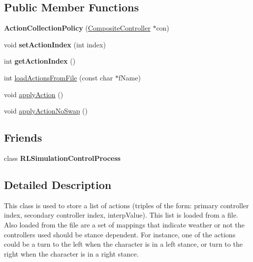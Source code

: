 \subsection*{Public Member Functions}
\begin{DoxyCompactItemize}
\item 
\hypertarget{classCartWheel_1_1Core_1_1ActionCollectionPolicy_a7380c4a5db84ecf445685c0c90b859d2}{
{\bfseries ActionCollectionPolicy} (\hyperlink{classCartWheel_1_1Core_1_1CompositeController}{CompositeController} $\ast$con)}
\label{classCartWheel_1_1Core_1_1ActionCollectionPolicy_a7380c4a5db84ecf445685c0c90b859d2}

\item 
\hypertarget{classCartWheel_1_1Core_1_1ActionCollectionPolicy_a221d8930e20ff82b76e67a353e070442}{
void {\bfseries setActionIndex} (int index)}
\label{classCartWheel_1_1Core_1_1ActionCollectionPolicy_a221d8930e20ff82b76e67a353e070442}

\item 
\hypertarget{classCartWheel_1_1Core_1_1ActionCollectionPolicy_ae20a888943cdd6d01697114ae3cf4058}{
int {\bfseries getActionIndex} ()}
\label{classCartWheel_1_1Core_1_1ActionCollectionPolicy_ae20a888943cdd6d01697114ae3cf4058}

\item 
int \hyperlink{classCartWheel_1_1Core_1_1ActionCollectionPolicy_a810258838684fde8a79b5df92d3eacde}{loadActionsFromFile} (const char $\ast$fName)
\item 
void \hyperlink{classCartWheel_1_1Core_1_1ActionCollectionPolicy_afe57e1a3ba3f7f8463e1d1b550a57d51}{applyAction} ()
\item 
void \hyperlink{classCartWheel_1_1Core_1_1ActionCollectionPolicy_a12bc039ce38d711ccb1f89bb395fc3a9}{applyActionNoSwap} ()
\end{DoxyCompactItemize}
\subsection*{Friends}
\begin{DoxyCompactItemize}
\item 
\hypertarget{classCartWheel_1_1Core_1_1ActionCollectionPolicy_a1cd8cd00d480ef41fceb1a0027f6c3d6}{
class {\bfseries RLSimulationControlProcess}}
\label{classCartWheel_1_1Core_1_1ActionCollectionPolicy_a1cd8cd00d480ef41fceb1a0027f6c3d6}

\end{DoxyCompactItemize}


\subsection{Detailed Description}
This class is used to store a list of actions (triples of the form: primary controller index, secondary controller index, interpValue). This list is loaded from a file. Also loaded from the file are a set of mappings that indicate weather or not the controllers used should be stance dependent. For instance, one of the actions could be a turn to the left when the character is in a left stance, or turn to the right when the character is in a right stance. 

